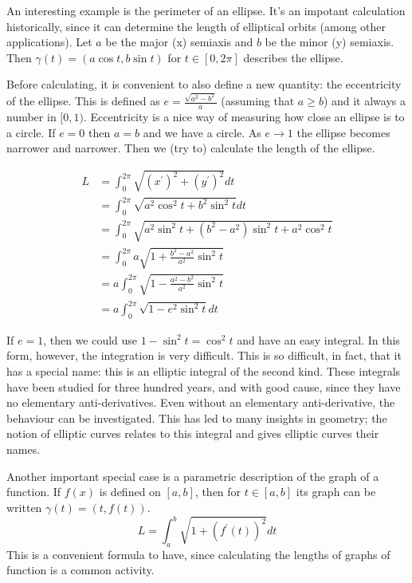 \documentclass[fleqn]{report}
\begin{document}
\begin{example}
An interesting example is the perimeter of an ellipse. It's
an impotant calculation historically, since it can determine
the length of elliptical orbits (among other applications). 
Let $a$ be the major (x) semiaxis and $b$ be the minor (y)
semiaxis. Then $\gamma(t) = (a \cos t, b \sin t)$ for $t \in
[0,2\pi]$ describes the ellipse. 

Before calculating, it is convenient to also define a new
quantity: the eccentricity of the ellipse. This is defined as
$e = \frac{\sqrt{a^2-b^2}}{a}$ (assuming that $a\geq b$) and
it always a number in $[0,1)$. Eccentricity is a nice way of
measuring how close an ellipse is to a circle. If $e = 0$ then
$a=b$ and we have a circle. As $e \rightarrow 1$ the ellipse
becomes narrower and narrower. Then we (try to) calculate the
length of the ellipse.

\begin{align*}
L & = \int_0^{2\pi} \sqrt{ (x^\prime)^2 + (y^\prime)^2} dt \\
& = \int_0^{2\pi} \sqrt{ a^2 \cos^2 t + b^2 \sin^2 t} dt \\
& = \int_0^{2\pi} \sqrt{ a^2 \sin^2 t + (b^2 - a^2) \sin^2 t +
a^2 \cos^2 t } \\
& = \int_0^{2\pi} a\sqrt{ 1 + \frac{b^2-a^2}{a^2} \sin^2 t} \\
& = a \int_0^{2\pi} \sqrt{ 1 - \frac{a^2 - b^2}{a^2} \sin^2 t} \\
& = a \int_0^{2\pi} \sqrt{ 1 - e^2 \sin^2 t}dt 
\end{align*}

If $e=1$, then we could use $1 - \sin^2 t = \cos^2 t$ and have
an easy integral. In this form, however, the integration is
very difficult. This is so difficult, in fact, that it has a
special name: this is an elliptic integral of the second kind.
These integrals have been studied for three hundred years, and
with good cause, since they have no elementary
anti-derivatives. Even without an elementary anti-derivative,
the behaviour can be investigated. This has led to many
insights in geometry; the notion of elliptic curves relates to
this integral and gives elliptic curves their names. 
\end{example}

\begin{example}
Another important special case is a parametric description of
the graph of a function. If $f(x)$ is defined on $[a,b]$, then
for $t \in [a,b]$ its graph can be written $\gamma(t) = (t,
f(t))$.
\begin{equation*}
L = \int_a^b \sqrt{1 + (f^\prime(t))^2}dt 
\end{equation*}
This is a convenient formula to have, since calculating the
lengths of graphs of function is a common activity.
\end{example}
\end{document}
